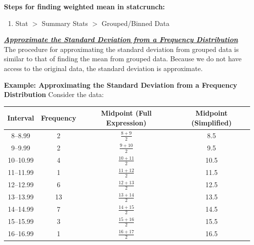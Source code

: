 \documentclass{report}
\begin{document}
         \pagebreak \bigbreak \noindent
         \textbf{Steps for finding weighted mean in statcrunch:}
         \bigbreak \noindent 
         \begin{enumerate}
             \item Stat $> $ Summary Stats $> $ Grouped/Binned Data  
         \end{enumerate}

         \bigbreak \noindent \bigbreak \noindent 
         \textbf{\textit{\underline{Approximate the Standard Deviation from a Frequency Distribution}}}
         \bigbreak \noindent 
         The procedure for approximating the standard deviation from grouped data is similar to that of finding the mean from grouped data. Because we do not have access to the original data, the standard deviation is approximate.
         \bigbreak \noindent 
         \begin{mdframed}
           \textbf{Example: Approximating the Standard Deviation from a Frequency Distribution}
           \bigbreak \noindent 
           Consider the data:
                                 \begin{center}
               \begin{tabular}{|c|c|c|c|}
                    \hline
                    Interval & Frequency & Midpoint (Full Expression) & Midpoint (Simplified) \\
                    \hline
                    8--8.99 & 2 & $\frac{8 + 9}{2}$ & 8.5 \\
                    \hline
                    9--9.99 & 2 & $\frac{9 + 10}{2}$ & 9.5 \\
                    \hline
                    10--10.99 & 4 & $\frac{10 + 11}{2}$ & 10.5 \\
                    \hline
                    11--11.99 & 1 & $\frac{11 + 12}{2}$ & 11.5 \\
                    \hline
                    12--12.99 & 6 & $\frac{12 + 13}{2}$ & 12.5 \\
                    \hline
                    13--13.99 & 13 & $\frac{13 + 14}{2}$ & 13.5 \\
                    \hline
                    14--14.99 & 7 & $\frac{14 + 15}{2}$ & 14.5 \\
                    \hline
                    15--15.99 & 3 & $\frac{15 + 16}{2}$ & 15.5 \\
                    \hline
                    16--16.99 & 1 & $\frac{16 + 17}{2}$ & 16.5 \\

\end{tabular}
\end{center}
\end{mdframed}
\end{document}
